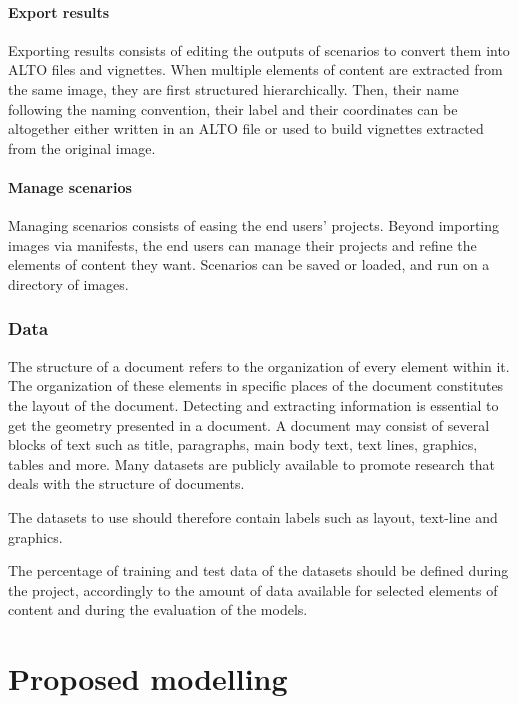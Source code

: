 \documentclass{polytech/polytech}
\numberwithin{figure}{chapter}
\begin{document}
\paragraph{Export results}

Exporting results consists of editing the outputs of scenarios to convert them into ALTO files and vignettes.
When multiple elements of content are extracted from the same image, they are first structured hierarchically.
Then, their name following the naming convention, their label and their coordinates can be altogether either written in an ALTO file or used to build vignettes extracted from the original image.

\paragraph{Manage scenarios}

Managing scenarios consists of easing the end users' projects.
Beyond importing images via manifests, the end users can manage their projects and refine the elements of content they want.
Scenarios can be saved or loaded, and run on a directory of images.


\subsubsection{Data}

The structure of a document refers to the organization of every element within it.
The organization of these elements in specific places of the document constitutes the layout of the document.
Detecting and extracting information is essential to get the geometry presented in a document.
A document may consist of several blocks of text such as title, paragraphs, main body text, text lines, graphics, tables and more.
Many datasets are publicly available to promote research that deals with the structure of documents.

The datasets to use should therefore contain labels such as layout, text-line and graphics.

The percentage of training and test data of the datasets should be defined during the project, accordingly to the amount of data available for selected elements of content and during the evaluation of the models.


\section{Proposed modelling}
\end{document}
